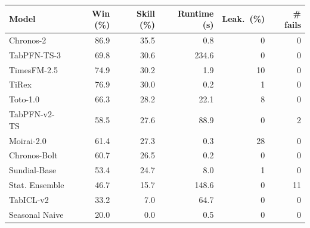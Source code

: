 \begin{tabular}{lrrrrr}
\toprule
\textbf{Model} & \textbf{Win (\%)} & \textbf{Skill (\%)} & \textbf{Runtime (s)} & \textbf{Leak.\ (\%)} & \textbf{\# fails} \\
\midrule
Chronos-2      & 86.9 & 35.5 & 0.8   & 0  & 0 \\
\textcolor{PriorMauve}{TabPFN-TS-3}    & 69.8 & 30.6 & 234.6 & 0  & 0 \\
TimesFM-2.5    & 74.9 & 30.2 & 1.9   & 10 & 0 \\
TiRex          & 76.9 & 30.0 & 0.2   & 1  & 0 \\
Toto-1.0       & 66.3 & 28.2 & 22.1  & 8  & 0 \\
\textcolor{PriorMauve}{TabPFN-v2-TS}   & 58.5 & 27.6 & 88.9  & 0  & 2 \\
Moirai-2.0     & 61.4 & 27.3 & 0.3   & 28 & 0 \\
Chronos-Bolt   & 60.7 & 26.5 & 0.2   & 0  & 0 \\
Sundial-Base   & 53.4 & 24.7 & 8.0   & 1  & 0 \\
Stat. Ensemble & 46.7 & 15.7 & 148.6 & 0  & 11 \\
TabICL-v2      & 33.2 & 7.0  & 64.7  & 0  & 0 \\
Seasonal Naive & 20.0 & 0.0  & 0.5   & 0  & 0 \\
\bottomrule
\end{tabular}
